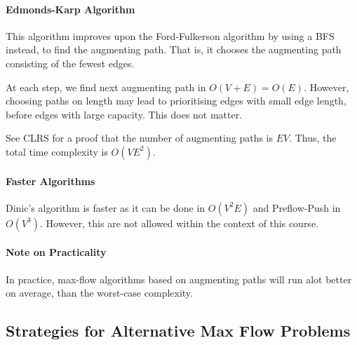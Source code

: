 \paragraph{Edmonds-Karp Algorithm}
This algorithm improves upon the Ford-Fulkerson algorithm by using a
BFS instead, to find the augmenting path.
That is, it chooses the augmenting path consisting of the fewest edges.

At each step, we find next augmenting path in \(O(V + E) = O(E)\).
However, choosing paths on length may lead to prioritising edges with
small edge length, before edges with large capacity. This does not matter.

See CLRS  for a proof that the number of augmenting paths is \(EV\).
Thus, the total time complexity is \(O(VE^2)\).

\paragraph{Faster Algorithms}
Dinic's algorithm is faster as it can be done in \(O(V^2E)\) and
Preflow-Push in \(O(V^3)\). However, this are not allowed within
the context of this course.

\paragraph{Note on Practicality}
In practice, max-flow algorithms based on augmenting paths will run
alot better on average, than the worst-case complexity.

%
%

\subsection{Strategies for Alternative Max Flow Problems}

